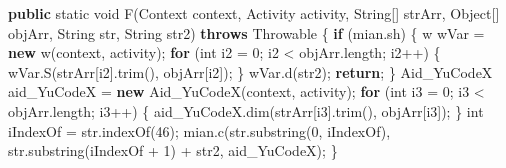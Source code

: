 \documentclass[
]{article}
\newenvironment{Shaded}{}{}
\newcommand{\BuiltInTok}[1]{\textcolor[rgb]{0.00,0.50,0.00}{#1}}
\newcommand{\ControlFlowTok}[1]{\textcolor[rgb]{0.00,0.44,0.13}{\textbf{#1}}}
\newcommand{\DataTypeTok}[1]{\textcolor[rgb]{0.56,0.13,0.00}{#1}}
\newcommand{\DecValTok}[1]{\textcolor[rgb]{0.25,0.63,0.44}{#1}}
\newcommand{\FunctionTok}[1]{\textcolor[rgb]{0.02,0.16,0.49}{#1}}
\newcommand{\KeywordTok}[1]{\textcolor[rgb]{0.00,0.44,0.13}{\textbf{#1}}}
\newcommand{\NormalTok}[1]{#1}
\newcommand{\OperatorTok}[1]{\textcolor[rgb]{0.40,0.40,0.40}{#1}}
\begin{document}
\begin{Shaded}
\begin{Highlighting}[]
    \KeywordTok{public} \DataTypeTok{static} \DataTypeTok{void} \FunctionTok{F}\OperatorTok{(}\BuiltInTok{Context}\NormalTok{ context}\OperatorTok{,}\NormalTok{ Activity activity}\OperatorTok{,} \BuiltInTok{String}\OperatorTok{[]}\NormalTok{ strArr}\OperatorTok{,} \BuiltInTok{Object}\OperatorTok{[]}\NormalTok{ objArr}\OperatorTok{,} \BuiltInTok{String}\NormalTok{ str}\OperatorTok{,} \BuiltInTok{String}\NormalTok{ str2}\OperatorTok{)} \KeywordTok{throws} \BuiltInTok{Throwable} \OperatorTok{\{}
        \ControlFlowTok{if} \OperatorTok{(}\NormalTok{mian}\OperatorTok{.}\FunctionTok{sh}\OperatorTok{)} \OperatorTok{\{}
\NormalTok{            w wVar }\OperatorTok{=} \KeywordTok{new} \FunctionTok{w}\OperatorTok{(}\NormalTok{context}\OperatorTok{,}\NormalTok{ activity}\OperatorTok{);}
            \ControlFlowTok{for} \OperatorTok{(}\DataTypeTok{int}\NormalTok{ i2 }\OperatorTok{=} \DecValTok{0}\OperatorTok{;}\NormalTok{ i2 }\OperatorTok{\textless{}}\NormalTok{ objArr}\OperatorTok{.}\FunctionTok{length}\OperatorTok{;}\NormalTok{ i2}\OperatorTok{++)} \OperatorTok{\{}
\NormalTok{                wVar}\OperatorTok{.}\FunctionTok{S}\OperatorTok{(}\NormalTok{strArr}\OperatorTok{[}\NormalTok{i2}\OperatorTok{].}\FunctionTok{trim}\OperatorTok{(),}\NormalTok{ objArr}\OperatorTok{[}\NormalTok{i2}\OperatorTok{]);}
            \OperatorTok{\}}
\NormalTok{            wVar}\OperatorTok{.}\FunctionTok{d}\OperatorTok{(}\NormalTok{str2}\OperatorTok{);}
            \ControlFlowTok{return}\OperatorTok{;}
        \OperatorTok{\}}
\NormalTok{        Aid\_YuCodeX aid\_YuCodeX }\OperatorTok{=} \KeywordTok{new} \FunctionTok{Aid\_YuCodeX}\OperatorTok{(}\NormalTok{context}\OperatorTok{,}\NormalTok{ activity}\OperatorTok{);}
        \ControlFlowTok{for} \OperatorTok{(}\DataTypeTok{int}\NormalTok{ i3 }\OperatorTok{=} \DecValTok{0}\OperatorTok{;}\NormalTok{ i3 }\OperatorTok{\textless{}}\NormalTok{ objArr}\OperatorTok{.}\FunctionTok{length}\OperatorTok{;}\NormalTok{ i3}\OperatorTok{++)} \OperatorTok{\{}
\NormalTok{            aid\_YuCodeX}\OperatorTok{.}\FunctionTok{dim}\OperatorTok{(}\NormalTok{strArr}\OperatorTok{[}\NormalTok{i3}\OperatorTok{].}\FunctionTok{trim}\OperatorTok{(),}\NormalTok{ objArr}\OperatorTok{[}\NormalTok{i3}\OperatorTok{]);}
        \OperatorTok{\}}
        \DataTypeTok{int}\NormalTok{ iIndexOf }\OperatorTok{=}\NormalTok{ str}\OperatorTok{.}\FunctionTok{indexOf}\OperatorTok{(}\DecValTok{46}\OperatorTok{);}
\NormalTok{        mian}\OperatorTok{.}\FunctionTok{c}\OperatorTok{(}\NormalTok{str}\OperatorTok{.}\FunctionTok{substring}\OperatorTok{(}\DecValTok{0}\OperatorTok{,}\NormalTok{ iIndexOf}\OperatorTok{),}\NormalTok{ str}\OperatorTok{.}\FunctionTok{substring}\OperatorTok{(}\NormalTok{iIndexOf }\OperatorTok{+} \DecValTok{1}\OperatorTok{)} \OperatorTok{+}\NormalTok{ str2}\OperatorTok{,}\NormalTok{ aid\_YuCodeX}\OperatorTok{);}
    \OperatorTok{\}}


\end{Highlighting}
\end{Shaded}
\end{document}
